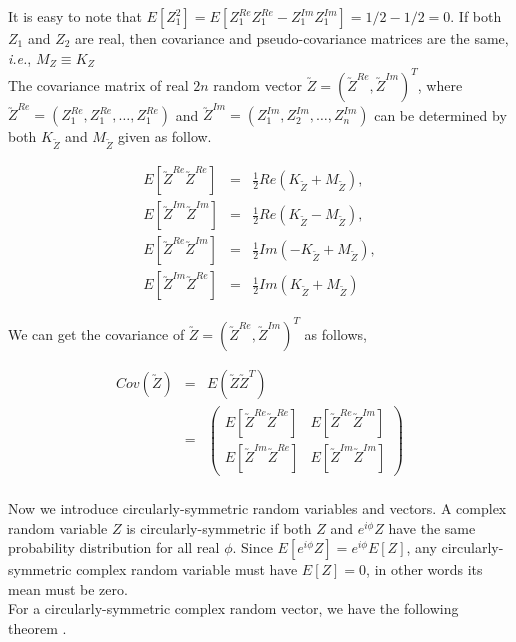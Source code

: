 It is easy to note that $E[Z_1^2] = E[Z_1^{Re}Z_1^{Re}-Z_1^{Im}Z_1^{Im}] = 1/2 -1/2 = 0$. If both $Z_1$ and $Z_2$ are real, then covariance and pseudo-covariance matrices are the same, {\em i.e.}, $M_Z \equiv K_Z$   \\

The covariance matrix of real $2n$ random vector $\utilde{Z}=(\utilde{Z}^{Re}, \utilde{Z}^{Im})^T$, where $\utilde{Z}^{Re} = (Z_1^{Re}, Z_1^{Re}, \ldots, Z_1^{Re})$ and $\utilde{Z}^{Im} = 
(Z_1^{Im}, Z_2^{Im}, \ldots, Z_n^{Im})$ can be determined by both $K_{\utilde{Z}}$ and $M_{\utilde{Z}}$ given as follow.

\begin{eqnarray}
	E[\utilde{Z}^{Re}\utilde{Z}^{Re}] &=& \frac{1}{2}Re(K_{\utilde{Z}} + M_{\utilde{Z}}), \nonumber\\
	E[\utilde{Z}^{Im}\utilde{Z}^{Im}] &=& \frac{1}{2}Re(K_{\utilde{Z}} - M_{\utilde{Z}}), \nonumber\\
	E[\utilde{Z}^{Re}\utilde{Z}^{Im}] &=& \frac{1}{2}Im(-K_{\utilde{Z}} + M_{\utilde{Z}}), \nonumber\\
	E[\utilde{Z}^{Im}\utilde{Z}^{Re}] &=& \frac{1}{2}Im(K_{\utilde{Z}} + M_{\utilde{Z}}) \label{comlex_cov}
\end{eqnarray}

We can get the covariance of $\utilde{Z}=(\utilde{Z}^{Re}, \utilde{Z}^{Im})^T$ as follows,

\begin{eqnarray*}
	Cov(\utilde{Z}) &=& E(\utilde{Z}\utilde{Z}^T) \\
	&=& \left( \begin{array}{ll}
	E[\utilde{Z}^{Re}\utilde{Z}^{Re}] &  E[\utilde{Z}^{Re}\utilde{Z}^{Im}] \\
	E[\utilde{Z}^{Im}\utilde{Z}^{Re}] &  E[\utilde{Z}^{Im}\utilde{Z}^{Im}]
	\end{array}
	\right) \\
\end{eqnarray*}

Now we introduce circularly-symmetric random variables and vectors. A complex random variable $Z$ is circularly-symmetric if both $Z$ and $e^{i\phi} Z$ have the same probability distribution for all real $\phi$.  Since $E[e^{i\phi}Z] = e^{i\phi}E[Z]$, any circularly-symmetric complex random variable must have $E[Z]=0$, in other words its mean must be zero. \\

For a circularly-symmetric complex random vector, we have the following theorem \cite{Gallager2008}.\\


